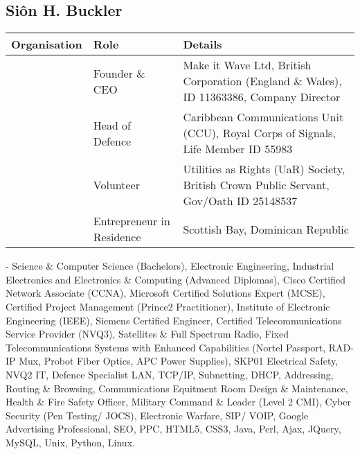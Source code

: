 \documentclass[letterpaper,10pt,english]{sphinxmanual}
\begin{document}
\subsection{Siôn H. Buckler}
\label{\detokenize{index:sion-h-buckler}}

\begin{savenotes}\sphinxattablestart
\centering
\begin{tabulary}{\linewidth}[t]{|T|T|T|}
\hline
\sphinxstyletheadfamily 
Organisation
&\sphinxstyletheadfamily 
Role
&\sphinxstyletheadfamily 
Details
\\
\hline
\noindent{}
&
Founder \& CEO
&
Make it Wave Ltd, British Corporation (England \& Wales), ID 11363386, Company Director
\\
\hline
\noindent{}
&
Head of Defence
&
Caribbean Communications Unit (CCU), Royal Corps of Signals, Life Member ID 55983
\\
\hline
\noindent{}
&
Volunteer
&
Utilities as Rights (UaR) Society, British Crown Public Servant, Gov/Oath ID 25148537
\\
\hline
\noindent{}
&
Entrepreneur in Residence
&
Scottish Bay, Dominican Republic
\\
\hline
\end{tabulary}
\par
\sphinxattableend\end{savenotes}

 - Science \& Computer Science (Bachelors), Electronic Engineering, Industrial Electronics and Electronics \& Computing (Advanced Diplomas), Cisco Certified Network Associate (CCNA), Microsoft Certified Solutions Expert (MCSE), Certified Project Management (Prince2 Practitioner), Institute of Electronic Engineering (IEEE), Siemens Certified Engineer, Certified Telecommunications Service Provider (NVQ3), Satellites \& Full Spectrum Radio, Fixed Telecommunications Systems with Enhanced Capabilities (Nortel Passport, RAD-IP Mux, Probot Fiber Optics, APC Power Supplies), SKP01 Electrical Safety, NVQ2 IT, Defence Specialist LAN, TCP/IP, Subnetting, DHCP, Addressing, Routing \& Browsing, Communications Equitment Room Design \& Maintenance, Health \& Fire Safety Officer, Military Command \& Leader (Level 2 CMI),  Cyber Security (Pen Testing/ JOCS), Electronic Warfare, SIP/ VOIP, Google Advertising Professional, SEO, PPC, HTML5, CSS3, Java, Perl, Ajax, JQuery, MySQL, Unix, Python, Linux.



\renewcommand{\indexname}{Index}
\printindex
\end{document}
